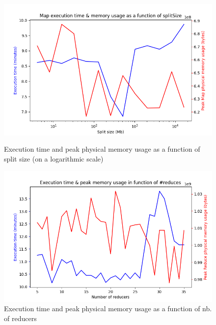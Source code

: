 \documentclass[11pt]{article}
\begin{document}
\begin{figure}
\begin{minipage}{.48\textwidth}
	\includegraphics[width=1.1\textwidth]{./img/ExecutionMapMemoryVSMaps.png}
	\caption{Execution time and peak physical memory usage as a function of split size (on a logarithmic scale)}
	\label{fig:splitSize}
\end{minipage}\hfill
\begin{minipage}{.48\textwidth}
	\includegraphics[width=1.1\textwidth]{./img/NewExecutionReduceMemoryVSMaps.png}
	\caption{Execution time and peak physical memory usage as a function of nb. of reducers}
	\label{fig:nbReducers}
\end{minipage}
\end{figure}
\end{document}
